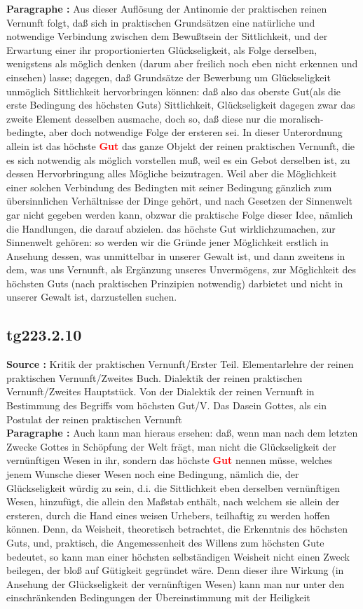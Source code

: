 \documentclass[a4paper,12pt,twoside]{book}
\newcommand{\match}[1]{\textcolor{red}{\textbf{#1}}}
\begin{document}
	\textbf{Paragraphe : }Aus dieser Auflösung der Antinomie der praktischen reinen Vernunft folgt, daß sich in praktischen Grundsätzen eine natürliche und notwendige Verbindung zwischen dem Bewußtsein der Sittlichkeit, und der Erwartung einer ihr proportionierten Glückseligkeit, als Folge derselben, wenigstens als möglich denken (darum aber freilich noch eben nicht erkennen und einsehen) lasse; dagegen, daß Grundsätze der Bewerbung um Glückseligkeit unmöglich Sittlichkeit hervorbringen können: daß also das oberste Gut(als die erste Bedingung des höchsten Guts) Sittlichkeit, Glückseligkeit dagegen zwar das zweite Element desselben ausmache, doch so, daß diese nur die moralisch-bedingte, aber doch notwendige Folge der ersteren sei. In dieser Unterordnung allein ist das höchste \match{Gut} das ganze Objekt der reinen praktischen Vernunft, die es sich notwendig als möglich vorstellen muß, weil es ein Gebot derselben ist, zu dessen Hervorbringung alles Mögliche beizutragen. Weil aber die Möglichkeit einer solchen Verbindung des Bedingten mit seiner Bedingung gänzlich zum übersinnlichen Verhältnisse der Dinge gehört, und nach Gesetzen der Sinnenwelt gar nicht gegeben werden kann, obzwar die praktische Folge dieser Idee, nämlich die Handlungen, die darauf abzielen. das höchste Gut wirklichzumachen, zur Sinnenwelt gehören: so werden wir die Gründe jener Möglichkeit erstlich in Ansehung dessen, was unmittelbar in unserer Gewalt ist, und dann zweitens in dem, was uns Vernunft, als Ergänzung unseres Unvermögens, zur Möglichkeit des höchsten Guts (nach praktischen Prinzipien notwendig) darbietet und nicht in unserer Gewalt ist, darzustellen suchen. 
	
	\subsection*{tg223.2.10} 
	\textbf{Source : }Kritik der praktischen Vernunft/Erster Teil. Elementarlehre der reinen praktischen Vernunft/Zweites Buch. Dialektik der reinen praktischen Vernunft/Zweites Hauptstück. Von der Dialektik der reinen Vernunft in Bestimmung des Begriffs vom höchsten Gut/V. Das Dasein Gottes, als ein Postulat der reinen praktischen Vernunft\\  
	
	\textbf{Paragraphe : }Auch kann man hieraus ersehen: daß, wenn man nach dem letzten Zwecke Gottes in Schöpfung der Welt frägt, man nicht die Glückseligkeit der vernünftigen Wesen in ihr, sondern das höchste \match{Gut} nennen müsse, welches jenem Wunsche dieser Wesen noch eine Bedingung, nämlich die, der Glückseligkeit würdig zu sein, d.i. die Sittlichkeit eben derselben vernünftigen Wesen, hinzufügt, die allein den Maßstab enthält, nach welchem sie allein der ersteren, durch die Hand eines weisen Urhebers, teilhaftig zu werden hoffen können. Denn, da Weisheit, theoretisch betrachtet, die Erkenntnis des höchsten Guts, und, praktisch, die Angemessenheit des Willens zum höchsten Gute bedeutet, so kann man einer höchsten selbständigen Weisheit nicht einen Zweck beilegen, der bloß auf Gütigkeit gegründet wäre. Denn dieser ihre Wirkung (in Ansehung der Glückseligkeit der vernünftigen Wesen)  kann man nur unter den einschränkenden Bedingungen der Übereinstimmung mit der Heiligkeit
	
\end{document}
